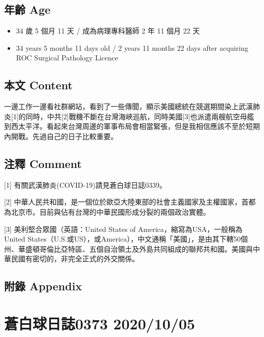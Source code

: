 \documentclass[a5paper, 11pt
]{book}
\providecommand{\tightlist}{%
  \setlength{\itemsep}{0pt}\setlength{\parskip}{0pt}}
\begin{document}
\hypertarget{ux5e74ux9f61-age-31}{%
\subsection{年齡 Age}\label{ux5e74ux9f61-age-31}}

\begin{itemize}
\tightlist
\item
  34 歲 5 個月 11 天 / 成為病理專科醫師 2 年 11 個月 22 天
\item
  34 years 5 months 11 days old / 2 years 11 months 22 days after
  acquiring ROC Surgical Pathology Licence
\end{itemize}

\hypertarget{ux672cux6587-content-31}{%
\subsection{本文 Content}\label{ux672cux6587-content-31}}

一邊工作一邊看社群網站，看到了一些傳聞，顯示美國總統在競選期間染上武漢肺炎{[}1{]}的同時，中共{[}2{]}戰機不斷在台灣海峽巡航，同時美國{[}3{]}也派遣兩艘航空母艦到西太平洋。看起來台灣周邊的軍事布局會相當緊張，但是我相信應該不至於短期內開戰。先過自己的日子比較重要。

\hypertarget{ux6ce8ux91cb-comment-31}{%
\subsection{注釋 Comment}\label{ux6ce8ux91cb-comment-31}}

{[}1{]} 有關武漢肺炎(COVID-19)請見蒼白球日誌0339。

{[}2{]}
中華人民共和國，是一個位於歐亞大陸東部的社會主義國家及主權國家，首都為北京市。目前與佔有台灣的中華民國形成分裂的兩個政治實體。

{[}3{]} 美利堅合眾國（英語：United States of
America，縮寫為USA，一般稱為United
States（U.S.或US），或America），中文通稱「美國」，是由其下轄50個州、華盛頓哥倫比亞特區、五個自治領土及外島共同組成的聯邦共和國。美國與中華民國有密切的，非完全正式的外交關係。

\hypertarget{ux9644ux9304-appendix-31}{%
\subsection{附錄 Appendix}\label{ux9644ux9304-appendix-31}}

\hypertarget{ux84bcux767dux7403ux65e5ux8a8c0373-20201005}{%
\section{蒼白球日誌0373
2020/10/05}\label{ux84bcux767dux7403ux65e5ux8a8c0373-20201005}}
\end{document}
